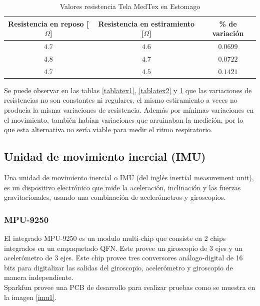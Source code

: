 \begin{table}[H]
	\centering
	\begin{tabular}{| c | c | c |}
		\hline
		\multicolumn{1}{|c|}{\textbf{Resistencia en reposo [$\Omega$]}}&
		\multicolumn{1}{c|}{\textbf{Resistencia en estiramiento [$\Omega$]}}&
		\multicolumn{1}{|c|}{\textbf{\% de variación}}\\ \hline
		$4.7$  & $4.6$  & $0.0699$  \\ \hline
		$4.8$  & $4.7$ & $0.0722$ \\ \hline
		$4.7$ & $4.5$  & $0.1421$  \\ \hline
	\end{tabular}
	\caption{Valores resistencia Tela MedTex en Estomago}
	\label{tablatex3}
\end{table}

Se puede observar en las tablas \ref{tablatex1}, \ref{tablatex2} y \ref{tablatex3} que las variaciones de resistencias no son constantes ni regulares, el mismo estiramiento a veces no producía la misma variaciones de resistencia. Además por mínimas variaciones en el movimiento, también habían variaciones que arruinaban la medición, por lo que esta alternativa no sería viable para medir el ritmo respiratorio.

\subsection{Unidad de movimiento inercial (IMU)}
Una unidad de movimiento inercial o IMU (del inglés inertial measurement unit), es un dispositivo electrónico que mide la aceleración, inclinación y las fuerzas gravitacionales, usando una combinación de acelerómetros y giroscopios.
\subsubsection{MPU-9250}
El integrado MPU-9250 es un modulo multi-chip que consiste en 2 chips integrados en un empaquetado QFN. Este provee un giroscopio de 3 ejes y un acelerómetro de 3 ejes.
Este chip provee tres conversores análogo-digital de 16 bits para digitalizar las salidas del giroscopio, acelerómetro y giroscopio de manera independiente.\\
Sparkfun provee una PCB de desarrollo para realizar pruebas como se muestra en la imagen \ref{imu1}.

